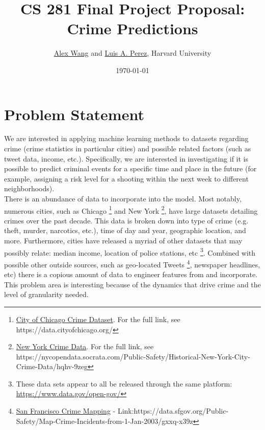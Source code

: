 \documentclass[10pt]{article}
\title{CS 281 Final Project Proposal: Crime Predictions}
\author{\href{mailto:alexwang@college.harvard.edu}{Alex Wang} and \href{mailto:luisperez@college.harvard.edu}{Luis A. Perez}, Harvard University}
\date{\today}
\begin{document}
 \begin{center}
  \end{center}

\section{Problem Statement}

    We are interested in applying machine learning methods to datasets regarding crime (crime statistics in particular cities) and possible related factors (such as tweet data, income, etc.). Specifically, we are interested in investigating if it is possible to predict criminal events for a specific time and place in the future (for example, assigning a risk level for a shooting within the next week to different neighborhoods). \\
    
	There is an abundance of data to incorporate into the model. Most notably, numerous cities, such as Chicago \footnote{\href{https://data.cityofchicago.org/}{City of Chicago Crime Dataset}. For the full link, see https://data.cityofchicago.org/} and New York \footnote{\href{https://nycopendata.socrata.com/Public-Safety/Historical-New-York-City-Crime-Data/hqhv-9zeg}{New York Crime Data}. For the full link, see https://nycopendata.socrata.com/Public-Safety/Historical-New-York-City-Crime-Data/hqhv-9zeg}, have large datasets detailing crimes over the past decade. This data is broken down into type of crime (e.g. theft, murder, narcotics, etc.), time of day and year, geographic location, and more. Furthermore, cities have released a myriad of other datasets that may possibly relate: median income, location of police stations, etc \footnote{These data sets appear to all be released through the same platform: \href{OpenData}{https://www.data.gov/open-gov/}}. Combined with possible other outside  sources, such as geo-located Tweets \footnote{\href{https://data.sfgov.org/Public-Safety/Map-Crime-Incidents-from-1-Jan-2003/gxxq-x39z}{San Francisco Crime Mapping} - Link:https://data.sfgov.org/Public-Safety/Map-Crime-Incidents-from-1-Jan-2003/gxxq-x39z}, newspaper headlines, etc) there is a copious amount of data to engineer features from and incorporate. This problem area is interesting because of the dynamics that drive crime and the level of granularity needed. \\
	
\end{document}
